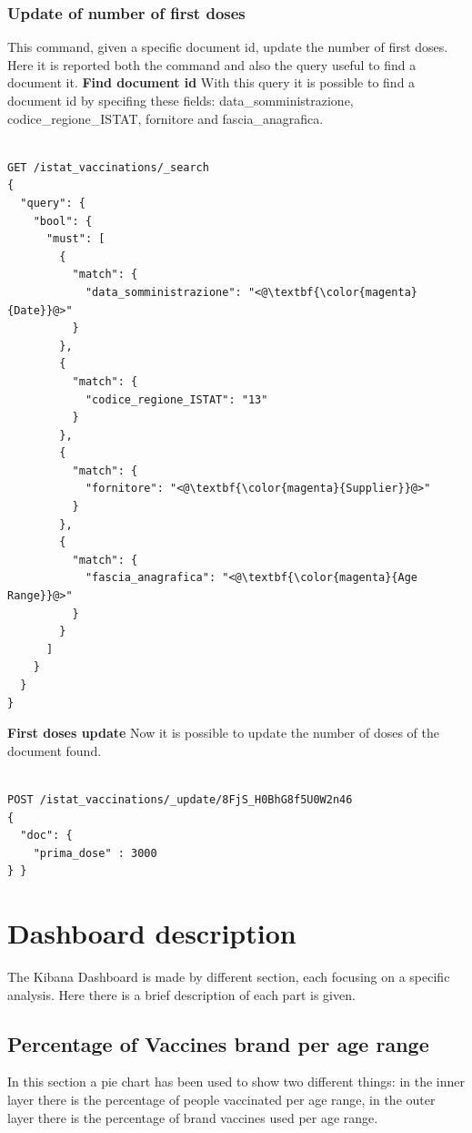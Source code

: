 \documentclass{article}
\begin{document}
\subsubsection{Update of number of first doses}
This command, given a specific document id, update the number of first doses. Here it is reported both the command and also the query useful to find a document it.
\hfill\break
\hfill\break
\textbf{Find document id}
\hfill\break
With this query it is possible to find a document id by specifing these fields: data\_somministrazione, codice\_regione\_ISTAT, fornitore and fascia\_anagrafica.

\begin{lstlisting}[language=cypher, label=lst:cypher-example]

GET /istat_vaccinations/_search
{
  "query": {
    "bool": {
      "must": [
        {
          "match": {
            "data_somministrazione": "<@\textbf{\color{magenta}{Date}}@>"
          }
        },
        {
          "match": {
            "codice_regione_ISTAT": "13"
          }
        },
        {
          "match": {
            "fornitore": "<@\textbf{\color{magenta}{Supplier}}@>"
          }
        },
        {
          "match": {
            "fascia_anagrafica": "<@\textbf{\color{magenta}{Age Range}}@>"
          }
        }
      ]
    }
  }
}
\end{lstlisting}
\hfill\break
\textbf{First doses update}
\hfill\break
Now it is possible to update the number of doses of the document found.

\begin{lstlisting}[language=cypher, label=lst:cypher-example]

POST /istat_vaccinations/_update/8FjS_H0BhG8f5U0W2n46
{
  "doc": {
    "prima_dose" : 3000
} }

\end{lstlisting}
\newpage

\section{Dashboard description}
The Kibana Dashboard is made by different section, each focusing on a specific analysis.
Here there is a brief description of each part is given.

\subsection{Percentage of Vaccines brand per age range}
In this section a pie chart has been used to show two different things: in the inner layer there is the percentage of people vaccinated per age range, in the outer layer there is the percentage of brand vaccines used per age range.
\end{document}
